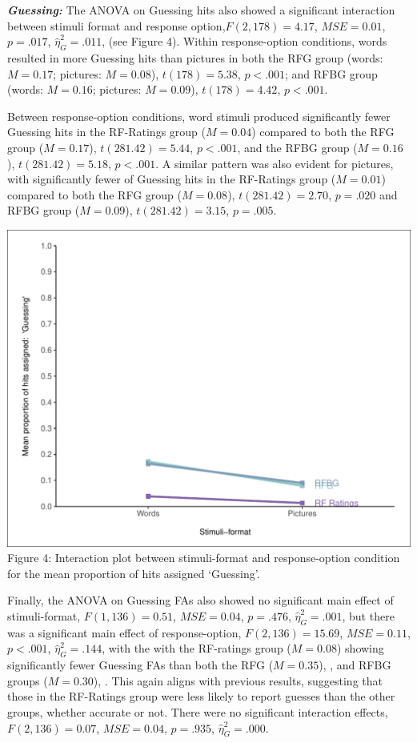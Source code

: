 \documentclass[
  11pt,
]{article}
\begin{document}
\textbf{\emph{Guessing:}} The ANOVA on Guessing hits also showed a
significant interaction between stimuli format and response
option,\(F(2, 178) = 4.17\), \(\mathit{MSE} = 0.01\), \(p = .017\),
\(\hat{\eta}^2_G = .011\), (see Figure 4). Within response-option
conditions, words resulted in more Guessing hits than pictures in both
the RFG group (words: \(M = 0.17\); pictures: \(M = 0.08\)),
\(t(178) = 5.38\), \(p < .001\); and RFBG group (words: \(M = 0.16\);
pictures: \(M = 0.09\)), \(t(178) = 4.42\), \(p < .001\).

Between response-option conditions, word stimuli produced significantly
fewer Guessing hits in the RF-Ratings group (\(M = 0.04\)) compared to
both the RFG group (\(M = 0.17\)), \(t(281.42) = 5.44\), \(p < .001\),
and the RFBG group (\(M = 0.16\)), \(t(281.42) = 5.18\), \(p < .001\). A
similar pattern was also evident for pictures, with significantly fewer
of Guessing hits in the RF-Ratings group (\(M = 0.01\)) compared to both
the RFG group (\(M = 0.08\)), \(t(281.42) = 2.70\), \(p = .020\) and
RFBG group (\(M = 0.09\)), \(t(281.42) = 3.15\), \(p = .005\).

\includegraphics{R--Thesis_files/figure-latex/unnamed-chunk-17-1.pdf}
Figure 4: Interaction plot between stimuli-format and response-option
condition for the mean proportion of hits assigned `Guessing'.

Finally, the ANOVA on Guessing FAs also showed no significant main
effect of stimuli-format, \(F(1, 136) = 0.51\), \(\mathit{MSE} = 0.04\),
\(p = .476\), \(\hat{\eta}^2_G = .001\), but there was a significant
main effect of response-option, \(F(2, 136) = 15.69\),
\(\mathit{MSE} = 0.11\), \(p < .001\), \(\hat{\eta}^2_G = .144\), with
the with the RF-ratings group (\(M = 0.08\)) showing significantly fewer
Guessing FAs than both the RFG (\(M = 0.35\)), , and RFBG groups
(\(M = 0.30\)), . This again aligns with previous results, suggesting
that those in the RF-Ratings group were less likely to report guesses
than the other groups, whether accurate or not. There were no
significant interaction effects, \(F(2, 136) = 0.07\),
\(\mathit{MSE} = 0.04\), \(p = .935\), \(\hat{\eta}^2_G = .000\).
\end{document}
